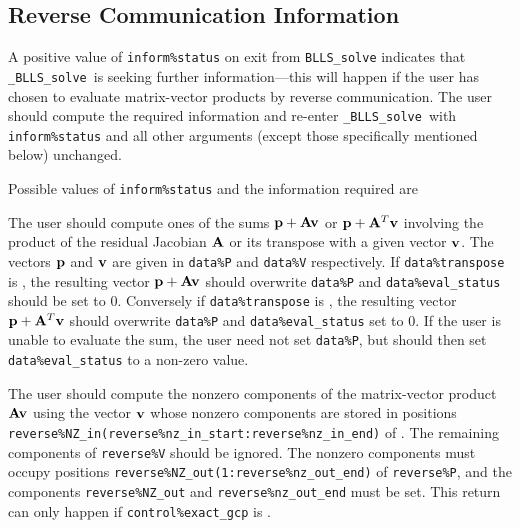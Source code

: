 \documentclass{galahad}
\newcommand{\packagename}{BLLS}
\newcommand{\fullpackagename}{\libraryname\_\packagename}
\newcommand{\solver}{{\tt \fullpackagename\_solve}}
\begin{document}

\subsection{\label{reverse}Reverse Communication Information}

A positive value of {\tt inform\%status} on exit from
{\tt \packagename\_solve}
indicates that
\solver\ is seeking further information---this will happen
if the user has chosen to evaluate matrix-vector products by
reverse communication.
The user should compute the required information and re-enter \solver\
with {\tt inform\%status} and all other arguments (except those specifically
mentioned below) unchanged.

Possible values of {\tt inform\%status} and the information required are
\begin{description}

 The user should compute ones of the sums ${\mathbf{p}} + {\mathbf{A}} {\mathbf{v}}$
     or ${\mathbf{p}} + {\mathbf{A}}^T {\mathbf{v}}$ involving the product of the residual
     Jacobian ${\mathbf{A}}$ or its transpose
     with a given vector ${\mathbf{v}}$.
     The vectors ${\mathbf{p}}$ and ${\mathbf{v}}$ are given in {\tt data\%P}
     and {\tt data\%V} respectively.
     If {\tt data\%transpose} is \false, the resulting
     vector ${\mathbf{p}} + {\mathbf{A}} {\mathbf{v}}$ should overwrite {\tt data\%P}
     and  {\tt data\%eval\_status} should be set to 0.
     Conversely if {\tt data\%transpose} is \true, the resulting
     vector ${\mathbf{p}} + {\mathbf{A}}^T {\mathbf{v}}$ should overwrite {\tt data\%P}
     and {\tt data\%eval\_status} set to 0. If the user is
     unable to evaluate the sum,
     the user need not set {\tt data\%P}, but
     should then set {\tt data\%eval\_status} to a non-zero value.

 The user should compute the nonzero components of the
     matrix-vector product ${\mathbf{A}} {\mathbf{v}}$
     using the vector ${\mathbf{v}}$ whose nonzero components are stored in
     positions
     {\tt reverse\%NZ\_in(reverse\%nz\_in\_start:reverse\%nz\_in\_end)}
     of \linebreak {\tt reverse\%V}. The remaining components of
     {\tt reverse\%V}
     should be ignored. The nonzero components must occupy positions
     {\tt reverse\%NZ\_out(1:reverse\%nz\_out\_end)} of {\tt reverse\%P},
     and the components \linebreak
     {\tt reverse\%NZ\_out} and {\tt reverse\%nz\_out\_end} must be set.
     This return can only happen if {\tt control\%exact\_gcp} is \true.

\end{description}
\end{document}
